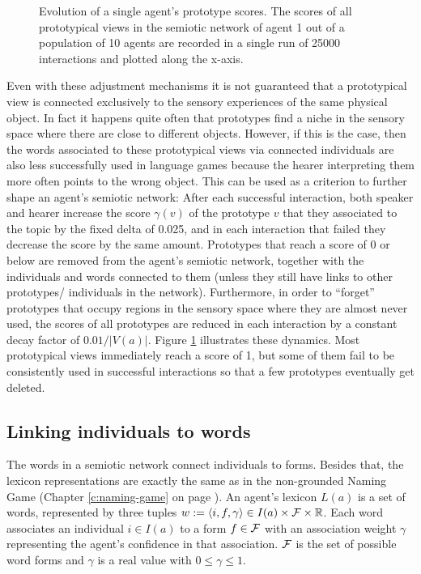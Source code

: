 \begin{figure}[t]
  \caption{Evolution of a single agent's prototype scores. The scores
    of all prototypical views in the semiotic network of agent 1 out
    of a population of 10 agents are recorded in a single run of 25000
    interactions and plotted along the x-axis.}
  \label{f:gng-evolution-of-prototype-scores}
\end{figure}

Even with these adjustment mechanisms it is not guaranteed that a
prototypical view is connected exclusively to the sensory experiences
of the same physical object. In fact it happens quite often that
prototypes find a niche in the sensory space where there are close to
different objects. However, if this is the case, then the words
associated to these prototypical views via connected individuals are
also less successfully used in language games because the hearer
interpreting them more often points to the wrong object. This can be
used as a criterion to further shape an agent's semiotic network:
After each successful interaction, both speaker and hearer increase
the score $\gamma(v)$ of the prototype $v$ that they associated to the
topic by the fixed delta of 0.025, and in each interaction that failed
they decrease the score by the same amount. Prototypes that reach a
score of 0 or below are removed from the agent's semiotic network,
together with the individuals and words connected to them (unless they
still have links to other prototypes/ individuals in the
network). Furthermore, in order to ``forget'' prototypes that occupy
regions in the sensory space where they are almost never used, the
scores of all prototypes are reduced in each interaction by a constant
decay factor of $0.01 / |V(a)|$. Figure
\ref{f:gng-evolution-of-prototype-scores} illustrates these
dynamics. Most prototypical views immediately reach a score of 1, but
some of them fail to be consistently used in successful interactions
so that a few prototypes eventually get deleted.


\subsection{Linking individuals to words}
\label{s:gng-lexicon}

The words in a semiotic network connect individuals to forms. Besides
that, the lexicon representations are exactly the same as in the
non-grounded Naming Game (Chapter \ref{c:naming-game} on page
\pageref{c:naming-game}). An agent's lexicon $L(a)$ is a set of words,
represented by three tuples $w := \langle i, f, \gamma \rangle \in
I(a)\times{\cal F}\times \mathbb{R}$. Each word associates an
individual $i \in I(a)$ to a form $f \in {\cal F}$ with an association
weight $\gamma$ representing the agent's confidence in that
association. ${\cal F}$ is the set of possible word forms and $\gamma$
is a real value with $0 \leq \gamma \leq 1$.

